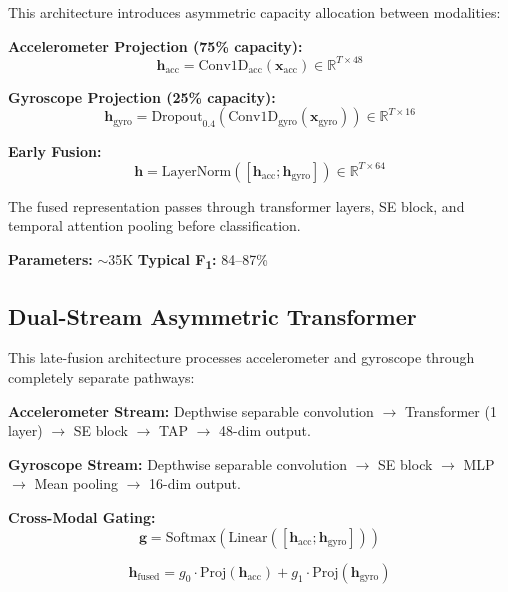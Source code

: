 \documentclass[journal,12pt]{IEEEtran}
\newcommand{\fone}{F\textsubscript{1}}
\begin{document}
This architecture introduces asymmetric capacity allocation between modalities:

\textbf{Accelerometer Projection (75\% capacity):}
\begin{equation}
\mathbf{h}_{\text{acc}} = \text{Conv1D}_{\text{acc}}(\mathbf{x}_{\text{acc}}) \in \mathbb{R}^{T \times 48}
\end{equation}

\textbf{Gyroscope Projection (25\% capacity):}
\begin{equation}
\mathbf{h}_{\text{gyro}} = \text{Dropout}_{0.4}(\text{Conv1D}_{\text{gyro}}(\mathbf{x}_{\text{gyro}})) \in \mathbb{R}^{T \times 16}
\end{equation}

\textbf{Early Fusion:}
\begin{equation}
\mathbf{h} = \text{LayerNorm}([\mathbf{h}_{\text{acc}}; \mathbf{h}_{\text{gyro}}]) \in \mathbb{R}^{T \times 64}
\end{equation}

The fused representation passes through transformer layers, SE block, and temporal attention pooling before classification.

\textbf{Parameters:} $\sim$35K \quad \textbf{Typical \fone{}:} 84--87\%

\subsection{Dual-Stream Asymmetric Transformer}
\label{sec:dualstream}

This late-fusion architecture processes accelerometer and gyroscope through completely separate pathways:

\textbf{Accelerometer Stream:} Depthwise separable convolution $\rightarrow$ Transformer (1 layer) $\rightarrow$ SE block $\rightarrow$ TAP $\rightarrow$ 48-dim output.

\textbf{Gyroscope Stream:} Depthwise separable convolution $\rightarrow$ SE block $\rightarrow$ MLP $\rightarrow$ Mean pooling $\rightarrow$ 16-dim output.

\textbf{Cross-Modal Gating:}
\begin{equation}
\label{eq:gate}
\mathbf{g} = \text{Softmax}(\text{Linear}([\mathbf{h}_{\text{acc}}; \mathbf{h}_{\text{gyro}}]))
\end{equation}

\begin{equation}
\label{eq:fusion}
\mathbf{h}_{\text{fused}} = g_0 \cdot \text{Proj}(\mathbf{h}_{\text{acc}}) + g_1 \cdot \text{Proj}(\mathbf{h}_{\text{gyro}})
\end{equation}
\end{document}
